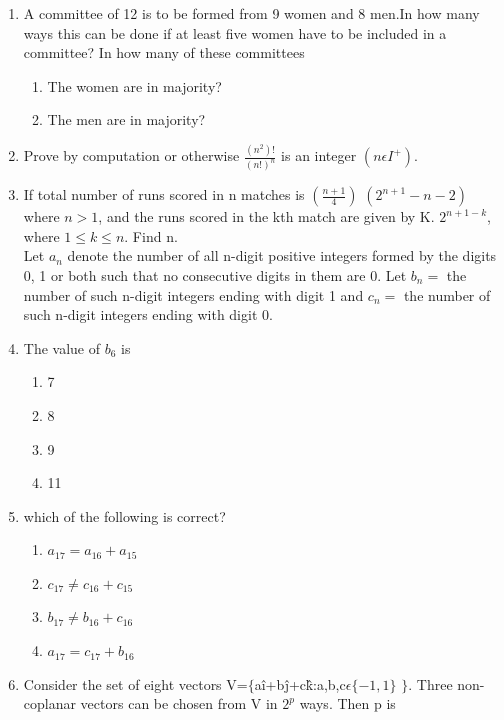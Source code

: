 \begin{enumerate}[label=\arabic*.,ref=\thesubsection.\theenumi]
\item A committee of 12 is to be formed from 9 women and 8 men.In how many ways this can be done if at least five women have to be included in a committee? In how many of these committees
\begin{enumerate}
\item The women are in majority?
\item The men are in majority?\\
\end{enumerate}
\item Prove by computation or otherwise $\frac{(n^2)!}{(n!)^n}$ is an integer $(n\epsilon I^+)$.\\
\item If total number of runs scored in n matches is $(\frac{n+1}{4})$ $(2^{n+1}-n-2)$ where $n>1$, and the runs scored in the kth match are given by K. $2^{n+1-k}$, where $1\leq k\leq n.$ Find n.\\

Let $a_n$ denote the number of all n-digit positive integers formed by the digits 0, 1 or both such that no consecutive digits in them are 0. Let $b_n=$ the number of such n-digit integers ending with digit 1 and $c_n=$ the number of such n-digit integers ending with digit 0.\\
\item The value of $b_6$ is
\begin{enumerate}
\item 7
\item 8
\item 9
\item 11\\
\end{enumerate}
\item which of the following is correct?
\begin{enumerate}
\item $a_{17} = a_{16} + a_{15}$
\item $c_{17} \neq c_{16} + c_{15}$
\item $b_{17} \neq b_{16} + c_{16}$
\item $a_{17} = c_{17} + b_{16}$\\
\end{enumerate}
\item Consider the set of eight vectors V=$\lbrace$a\^{i}+b\^{j}+c\^{k}:a,b,c$\epsilon\lbrace-1,1\rbrace$ $\rbrace.$ Three non-coplanar vectors can be chosen from V in $2^p$ ways. Then p is\\


\end{enumerate}
